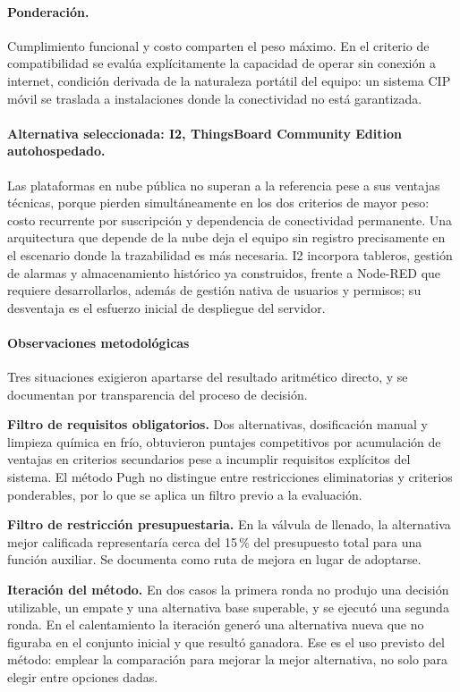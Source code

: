 

\paragraph{Ponderación.} Cumplimiento funcional y costo comparten el peso máximo. En el criterio de compatibilidad se evalúa explícitamente la capacidad de operar sin conexión a internet, condición derivada de la naturaleza portátil del equipo: un sistema CIP móvil se traslada a instalaciones donde la conectividad no está garantizada.

\paragraph{Alternativa seleccionada: I2, ThingsBoard Community Edition autohospedado.} Las plataformas en nube pública no superan a la referencia pese a sus ventajas técnicas, porque pierden simultáneamente en los dos criterios de mayor peso: costo recurrente por suscripción y dependencia de conectividad permanente. Una arquitectura que depende de la nube deja el equipo sin registro precisamente en el escenario donde la trazabilidad es más necesaria. I2 incorpora tableros, gestión de alarmas y almacenamiento histórico ya construidos, frente a Node-RED que requiere desarrollarlos, además de gestión nativa de usuarios y permisos; su desventaja es el esfuerzo inicial de despliegue del servidor.




\paragraph{Observaciones metodológicas}

Tres situaciones exigieron apartarse del resultado aritmético directo, y se documentan por transparencia del proceso de decisión.

\textbf{Filtro de requisitos obligatorios.} Dos alternativas, dosificación manual y limpieza química en frío, obtuvieron puntajes competitivos por acumulación de ventajas en criterios secundarios pese a incumplir requisitos explícitos del sistema. El método Pugh no distingue entre restricciones eliminatorias y criterios ponderables, por lo que se aplica un filtro previo a la evaluación.

\textbf{Filtro de restricción presupuestaria.} En la válvula de llenado, la alternativa mejor calificada representaría cerca del 15\,\% del presupuesto total para una función auxiliar. Se documenta como ruta de mejora en lugar de adoptarse.

\textbf{Iteración del método.} En dos casos la primera ronda no produjo una decisión utilizable, un empate y una alternativa base superable, y se ejecutó una segunda ronda. En el calentamiento la iteración generó una alternativa nueva que no figuraba en el conjunto inicial y que resultó ganadora. Ese es el uso previsto del método: emplear la comparación para mejorar la mejor alternativa, no solo para elegir entre opciones dadas.

